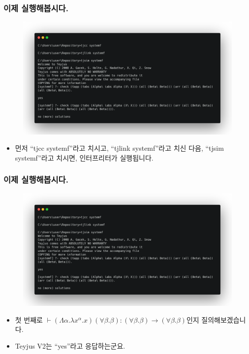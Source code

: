 \documentclass[slidestop,compress,mathserif]{beamer}
\begin{document}
    \begin{frame}
        \frametitle{이제 실행해봅시다.}
        \begin{figure}[h]
            \begin{center}
                \includegraphics[width=0.9\linewidth]{fin.png}
            \end{center}
        \end{figure}
        \begin{itemize}
            \item 먼저 ``tjcc systemf''라고 치시고, ``tjlink systemf''라고 치신 다음, ``tjsim systemf''라고 치시면, 인터프리터가 실행됩니다.
        \end{itemize}
    \end{frame}

    \begin{frame}
        \frametitle{이제 실행해봅시다.}
        \begin{figure}[h]
            \begin{center}
                \includegraphics[width=0.9\linewidth]{fin.png}
            \end{center}
        \end{figure}
        \begin{itemize}
            \item 첫 번째로 $\vdash \left( \Lambda \alpha . \lambda x^{\alpha} . x \right) \left( \forall \beta . \beta \right) : \left( \forall \beta . \beta \right) \to \left( \forall \beta . \beta \right)$인지 질의해보겠습니다.
            \item Teyjus V2는 ``yes''라고 응답하는군요.
        \end{itemize}
    \end{frame}
\end{document}
